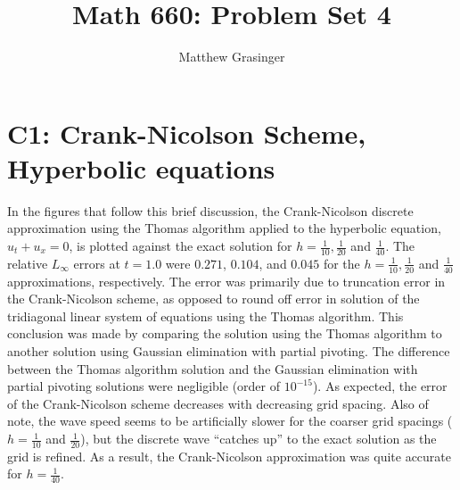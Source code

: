 \documentclass[a4paper,10pt]{article}
\title{Math 660: Problem Set 4}
\author{Matthew Grasinger}
\begin{document}
  \maketitle
  \tableofcontents

	\section{C1: Crank-Nicolson Scheme, Hyperbolic equations} \label{sec:c1}
	
	In the figures that follow this brief discussion, the Crank-Nicolson discrete approximation using the Thomas algorithm applied to the hyperbolic equation, $u_t + u_x = 0$, is plotted against the exact solution for $h = \frac{1}{10}, \frac{1}{20}$ and $\frac{1}{40}$.
	The relative $L_\infty$ errors at $t = 1.0$ were $0.271$, $0.104$, and $0.045$ for the $h = \frac{1}{10}, \frac{1}{20}$ and $\frac{1}{40}$ approximations, respectively.
	The error was primarily due to truncation error in the Crank-Nicolson scheme, as opposed to round off error in solution of the tridiagonal linear system of equations using the Thomas algorithm.
	This conclusion was made by comparing the solution using the Thomas algorithm to another solution using Gaussian elimination with partial pivoting.
	The difference between the Thomas algorithm solution and the Gaussian elimination with partial pivoting solutions were negligible (order of $10^{-15}$).
	As expected, the error of the Crank-Nicolson scheme decreases with decreasing grid spacing.
	Also of note, the wave speed seems to be artificially slower for the coarser grid spacings ($h = \frac{1}{10}$ and $\frac{1}{20}$), but the discrete wave ``catches up'' to the exact solution as the grid is refined.
	As a result, the Crank-Nicolson approximation was quite accurate for $h = \frac{1}{40}$.
\end{document}
